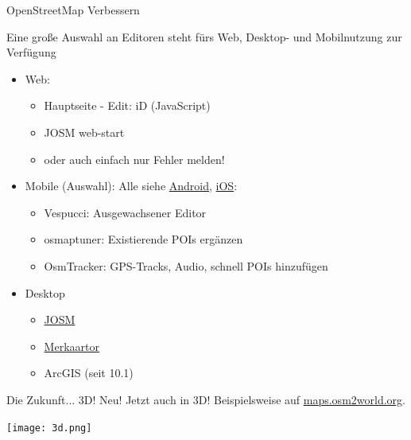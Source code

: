 \documentclass{beamer}
\begin{document}
\begin{frame}{OpenStreetMap Verbessern}

  Eine große Auswahl an Editoren steht fürs Web, Desktop- und Mobilnutzung zur Verfügung

  \begin{itemize}
    \item Web:
    \begin{itemize}
	    \item Hauptseite - Edit: iD (JavaScript)
      \item JOSM web-start
      \item oder auch einfach nur Fehler melden!
	      \pause
    \end{itemize}
    \item Mobile (Auswahl): Alle siehe  \href{http://wiki.openstreetmap.org/wiki/Android\#OpenStreetMap\_editing\_features}{Android}, \href{http://wiki.openstreetmap.org/wiki/Apple\_iOS\#OpenStreetMap\_editing\_features}{iOS}:
    \begin{itemize}
      \item Vespucci: Ausgewachsener Editor
      \item osmaptuner: Existierende POIs ergänzen
      \item OsmTracker: GPS-Tracks, Audio, schnell POIs hinzufügen
    \end{itemize}
  \item Desktop
    \begin{itemize}
      \item \href{http://josm.openstreetmap.de}{JOSM}
      \item \href{http://merkaartor.be}{Merkaartor}
      \item ArcGIS (seit 10.1)
    \end{itemize}
  \end{itemize}

\end{frame}

\begin{frame}{Die Zukunft... 3D! }
  Neu! Jetzt auch in 3D! Beispielsweise auf \href{http://maps.osm2world.org/?zoom=17&lat=47.06156&lon=15.46983&layers=BF0FTFFF}{maps.osm2world.org}.

  \texttt{[image: 3d.png]}


\end{frame}
\end{document}
